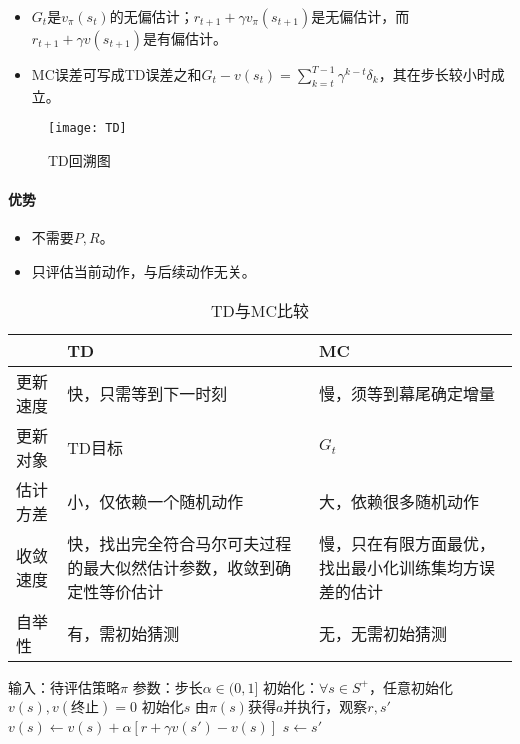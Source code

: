 \documentclass[
12pt, %
a4paper, 
oneside, %
headinclude,footinclude, %
]{scrartcl}
\begin{document}
\begin{itemize}
\item $ G_t $是$ v_{\pi}(s_t) $的无偏估计；$ r_{t + 1} + \gamma v_{\pi}(s_{t + 1}) $是无偏估计，而$ r_{t + 1} + \gamma v(s_{t + 1}) $是有偏估计。
\item MC误差可写成TD误差之和$ G_t - v(s_t) = \sum_{k = t}^{T - 1} \gamma^{k - t} \delta_k $，其在步长较小时成立。
\end{itemize}

\begin{figure}[H]
\centering
\texttt{[image: TD]}
\caption{TD回溯图}
\end{figure}
\paragraph{优势}
\begin{itemize}
\item 不需要$ P, R $。
\item 只评估当前动作，与后续动作无关。
\end{itemize}

\begin{table}[H]
\centering
\begin{tabular}{|p{3cm}|p{5.5cm}|p{5.5cm}|}
\hline
& TD & MC \\
\hline
更新速度 & 快，只需等到下一时刻 & 慢，须等到幕尾确定增量 \\
\hline
更新对象 & TD目标 & $ G_t $ \\
\hline
估计方差 & 小，仅依赖一个随机动作 & 大，依赖很多随机动作 \\
\hline
收敛速度 & 快，找出完全符合马尔可夫过程的最大似然估计参数，收敛到确定性等价估计 & 慢，只在有限方面最优，找出最小化训练集均方误差的估计 \\
\hline
自举性 & 有，需初始猜测 & 无，无需初始猜测 \\
\hline
\end{tabular}
\caption{TD与MC比较}
\end{table}
\begin{myalgorithm}[TD($ 0 $)]
\State 输入：待评估策略$ \pi $
\State 参数：步长$ \alpha \in (0, 1] $
\State 初始化：$ \forall s \in S^+ $，任意初始化$ v(s), v(\text{终止}) = 0 $
\State 初始化$ s $
\State 由$ \pi(s) $获得$ a $并执行，观察$ r, s' $
\State $ v(s) \gets v(s) + \alpha[r + \gamma v(s') - v(s)] $
\State $ s \gets s' $
\EndWhile
\EndFor
\end{myalgorithm}
\end{document}
